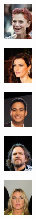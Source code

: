\documentclass{article}
\begin{document}
\begin{enumerate}
\begin{enumerate}
\begin{figure}[h!]
\begin{minipage}{0.8\textwidth}
						\begin{subfigure}[b]{0.18\textwidth}
							\centering
							\includegraphics[height=1.9cm]{000002}
						\end{subfigure}
						\hfill
						\begin{subfigure}[b]{0.18\textwidth}
							\centering
							\includegraphics[height=1.9cm]{000073}
						\end{subfigure}
						\hfill
						\begin{subfigure}[b]{0.18\textwidth}
							\centering
							\includegraphics[height=1.9cm]{000012}
						\end{subfigure}
						\hfill
						\begin{subfigure}[b]{0.18\textwidth}
							\centering
							\includegraphics[height=1.9cm]{000020}
						\end{subfigure}
						\hfill
						\begin{subfigure}[b]{0.18\textwidth}
							\centering
							\includegraphics[height=1.9cm]{000022}
						\end{subfigure}

						\vspace{0.6cm} %


\end{minipage}
\end{figure}
\end{enumerate}
\end{enumerate}
\end{document}
